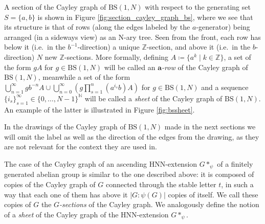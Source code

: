 \documentclass[letterpaper,11pt,reqno]{amsart}
\theoremstyle{plain}
\theoremstyle{definition}
\theoremstyle{cupremark}
\newcommand{\BS}[1][N]{\mathrm{BS}(1,#1)}
\begin{document}
A section of the Cayley graph of $\BS$ with respect to the generating set $S=\{a,b\}$ is shown in Figure \ref{fig:section_cayley_graph_bs}, where we see that its structure is that of rows (along the edges labeled by the $a$-generator) being arranged (in a sideways view) as an N-ary tree. Seen from the front, each row has below it (i.e.\ in the $b^{-1}$-direction) a unique $\mathbb{Z}$-section, and above it (i.e.\ in the $b$-direction) $N$ new $\mathbb{Z}$-sections. More formally, defining $A\coloneqq\{a^k \mid k\in\mathbb{Z}\}$, a set of the form $gA$ for $g\in \BS$ will be called an $\mathbf{a}$\textit{-row} of the Cayley graph of $\BS$, meanwhile a set of the form $\displaystyle\bigcup_{n=1}^{\infty}gb^{-n}A  \cup\bigcup_{n=0}^\infty\left( g\prod_{s=1}^{n}(a^{i_s}b)A \right)$ for $g\in \BS$ and a sequence $\{i_s\}_{s=1}^{\infty}\in \{0,\ldots,N-1\}^{\mathbb{N}}$ will be called a \textit{sheet} of the Cayley graph of $\BS$. An example of the latter is illustrated in Figure \ref{fig:bssheet}. 

In the drawings of the Cayley graph of $\BS$ made in the next sections we will omit the label as well as the direction of the edges from the drawing, as they are not relevant for the context they are used in.

The case of the Cayley graph of an ascending HNN-extension $G*_{\psi}$ of a finitely generated abelian group is similar to the one described above: it is composed of copies of the Cayley graph of $G$ connected through the stable letter $t$, in such a way that each one of them has above it $|G:\psi(G)|$ copies of itself. We call these copies of $G$ the $G$\textit{-sections} of the Cayley graph. We analogously define the notion of a \textit{sheet} of the Cayley graph of the HNN-extension $G*_{\psi}$.
\end{document}
